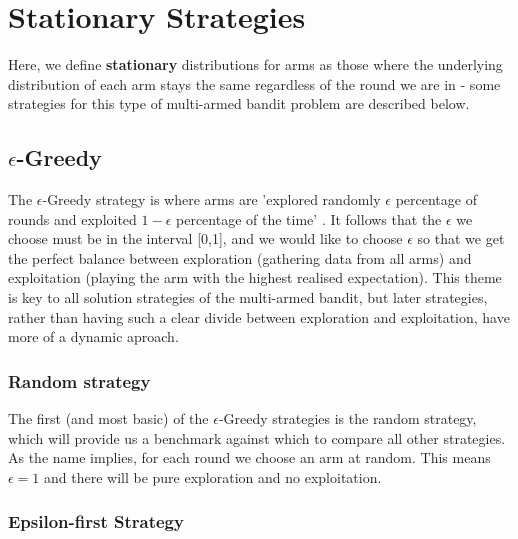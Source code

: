 \section{Stationary Strategies}\label{sec:stationary-strategies}
Here, we define \textbf{stationary} distributions for arms as those where the underlying distribution of each arm stays the same regardless of the round we are in - some strategies for this type of multi-armed bandit problem are described below.

\subsection{$\epsilon$-Greedy}\label{subsec: $epsilon$-greedy}
    The $\epsilon$-Greedy strategy is where arms are 'explored randomly $\epsilon$ percentage of rounds and exploited $1-\epsilon$ percentage of the time' \citep{DBLP:journals/corr/abs-1807-09809}.
    It follows that the $\epsilon$ we choose must be in the interval [0,1], and we would like to choose $\epsilon$ so that we get the perfect balance between exploration (gathering data from all arms) and exploitation (playing the arm with the highest realised expectation).
    This theme is key to all solution strategies of the multi-armed bandit, but later strategies, rather than having such a clear divide between exploration and exploitation, have more of a dynamic aproach.

    \subsubsection{Random strategy}
    The first (and most basic) of the $\epsilon$-Greedy strategies is the random strategy, which will provide us a benchmark against which to compare all other strategies.
    As the name implies, for each round we choose an arm at random.
    This means $\epsilon=1$ and there will be pure exploration and no exploitation.

    \subsubsection{Epsilon-first Strategy}

